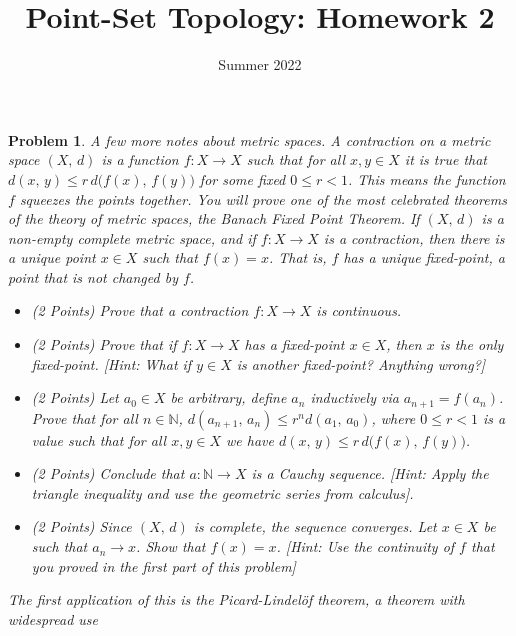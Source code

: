 \documentclass{article}
\title{Point-Set Topology: Homework 2}
\date{Summer 2022}
\theoremstyle{normal}
\newtheorem{problem}{Problem}
\begin{document}
    \maketitle
    \begin{problem}
        A few more notes about metric spaces. A \textit{contraction} on a
        metric space $(X,\,d)$ is a function $f:X\rightarrow{X}$ such that
        for all $x,y\in{X}$ it is true that
        $d(x,\,y)\leq{r}\,d\big(f(x),\,f(y)\big)$ for some fixed $0\leq{r}<1$.
        This means the function $f$ \textit{squeezes} the points together.
        You will prove one of the most celebrated theorems of the theory of
        metric spaces, the \textit{Banach Fixed Point Theorem}.
        If $(X,\,d)$ is a non-empty complete metric space, and if
        $f:X\rightarrow{X}$ is
        a contraction, then there is a unique point $x\in{X}$ such that
        $f(x)=x$. That is, $f$ has a unique \textit{fixed-point}, a point that
        is not changed by $f$.
        \begin{itemize}
            \item (2 Points) Prove that a contraction $f:X\rightarrow{X}$ is
                continuous.
            \item (2 Points) Prove that if $f:X\rightarrow{X}$ has a
                fixed-point $x\in{X}$, then $x$ is the only fixed-point.
                [Hint: What if $y\in{X}$ is another fixed-point? Anything wrong?]
            \item (2 Points) Let $a_{0}\in{X}$ be arbitrary, define $a_{n}$
                inductively via $a_{n+1}=f(a_{n})$. Prove that for all
                $n\in\mathbb{N}$,
                $d(a_{n+1},\,a_{n})\leq{r}^{n}d(a_{1},\,a_{0})$, where
                $0\leq{r}<1$ is a value such that for all
                $x,y\in{X}$ we have $d(x,\,y)\leq{r}\,d\big(f(x),\,f(y)\big)$.
            \item (2 Points) Conclude that $a:\mathbb{N}\rightarrow{X}$ is a
                Cauchy sequence. [Hint: Apply the triangle inequality and use
                the geometric series from calculus].
            \item (2 Points) Since $(X,\,d)$ is complete, the sequence
            converges. Let $x\in{X}$ be such that
            $a_{n}\rightarrow{x}$. Show that $f(x)=x$.
            [Hint: Use the continuity of $f$ that you proved in the first part
            of this problem]
        \end{itemize}
        The first application of this is the
        \textit{Picard-Lindel\"{o}f theorem}, a theorem with widespread use

\end{problem}
\end{document}

